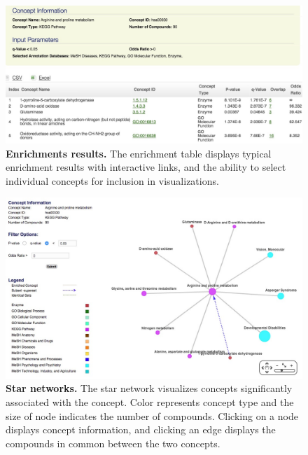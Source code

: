 \newpage

\begin{figure}[ht!]
\centering
\includegraphics[width=1\textwidth]{chap3figs/figure3_5.jpg}
\caption[Enrichment results.]
{
\textbf{Enrichments results.} The enrichment table displays typical enrichment results with interactive links, and the ability to select individual concepts for inclusion in visualizations.
}
\label{chap3:fig:5}
\end{figure}

\newpage

\begin{figure}[ht!]
\centering
\includegraphics[width=1\textwidth]{chap3figs/figure3_6.jpg}
\caption[Star networks.]
{
\textbf{Star networks.} The star network visualizes concepts significantly associated with the concept. Color represents concept type and the size of node indicates the number of compounds. Clicking on a node displays concept information, and clicking an edge displays the compounds in common between the two concepts.
}
\label{chap3:fig:6}
\end{figure}

